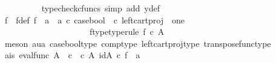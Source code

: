 \begin{isabellebody}
\ \ \ \ \ \ \ \ \isamarkupfalse%
\ {\isacharparenleft}{\kern0pt}typecheck{\isacharunderscore}{\kern0pt}cfuncs{\isacharcomma}{\kern0pt}\ simp\ add{\isacharcolon}{\kern0pt}\ y{\isacharunderscore}{\kern0pt}def{\isacharparenright}{\kern0pt}\isanewline
\ \ \ \ \ \isanewline
\ \ \ \ \isanewline
\ \ \ \ \ \ \isamarkupfalse%
\ f\ \ f{\isacharunderscore}{\kern0pt}def{\isacharcolon}{\kern0pt}\ {\isachardoublequoteopen}f\ {\isacharequal}{\kern0pt}\ {\isacharparenleft}{\kern0pt}{\isacharparenleft}{\kern0pt}a{}\ {\isasymamalg}\ a{}{\isacharparenright}{\kern0pt}\ {\isasymcirc}\isactrlsub c\ case{\isacharunderscore}{\kern0pt}bool\ \ {\isasymcirc}\isactrlsub c\ left{\isacharunderscore}{\kern0pt}cart{\isacharunderscore}{\kern0pt}proj\ {\isasymOmega}\ one{\isacharparenright}{\kern0pt}\isactrlsup {\isasymsharp}{\isachardoublequoteclose}\ \isanewline
\ \ \ \ \ \ \ \ \ \ \ \ \ \ \ \ \ \ \ \ \ f{\isacharunderscore}{\kern0pt}type{\isacharbrackleft}{\kern0pt}type{\isacharunderscore}{\kern0pt}rule{\isacharbrackright}{\kern0pt}{\isacharcolon}{\kern0pt}\ {\isachardoublequoteopen}f\ {\isasymin}\isactrlsub c\ A\isactrlbsup {\isasymOmega}\isactrlesup {\isachardoublequoteclose}\isanewline
\ \ \ \ \ \ \ \ \isamarkupfalse%
\ {\isacharparenleft}{\kern0pt}meson\ aua\ case{\isacharunderscore}{\kern0pt}bool{\isacharunderscore}{\kern0pt}type\ comp{\isacharunderscore}{\kern0pt}type\ left{\isacharunderscore}{\kern0pt}cart{\isacharunderscore}{\kern0pt}proj{\isacharunderscore}{\kern0pt}type\ transpose{\isacharunderscore}{\kern0pt}func{\isacharunderscore}{\kern0pt}type{\isacharparenright}{\kern0pt}\isanewline
\ \ \ \ \ \isamarkupfalse%
\ a{}{\isacharunderscore}{\kern0pt}is{\isacharcolon}{\kern0pt}\ {\isachardoublequoteopen}{\isacharparenleft}{\kern0pt}eval{\isacharunderscore}{\kern0pt}func\ A\ {\isasymOmega}\ {\isasymcirc}\isactrlsub c\ {\isasymlangle}{\isasymt}\ {\isasymcirc}\isactrlsub c\ {\isasymbeta}\isactrlbsub A\isactrlbsup {\isasymOmega}\isactrlesup \isactrlesub {\isacharcomma}{\kern0pt}\ id{\isacharparenleft}{\kern0pt}A\isactrlbsup {\isasymOmega}\isactrlesup {\isacharparenright}{\kern0pt}{\isasymrangle}{\isacharparenright}{\kern0pt}\ {\isasymcirc}\isactrlsub c\ f\ {\isacharequal}{\kern0pt}\ a{}{\isachardoublequoteclose}\isanewline
\ \ \ \ \ \isamarkupfalse%
{\isacharminus}{\kern0pt}\isanewline
\ \ \ \ \ \ \ \isamarkupfalse%

\end{isabellebody}
